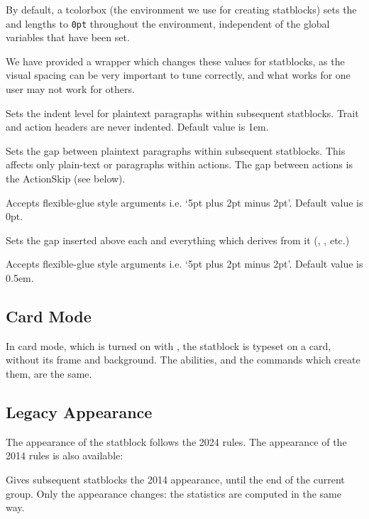 		By default, a tcolorbox (the environment we use for creating statblocks) sets the  and  lengths to \texttt{0pt} throughout the environment, independent of the global variables that have been set.

		We have provided a wrapper which changes these values for statblocks, as the visual spacing can be very important to tune correctly, and what works for one user may not work for others.

		{
			Sets the indent level for plaintext paragraphs within subsequent statblocks. Trait and action headers are never indented. Default value is 1em.
		}
		{
			Sets the gap between plaintext paragraphs within subsequent statblocks. This affects only plain-text or paragraphs within actions. The gap between actions is the ActionSkip (see below).

			Accepts flexible-glue style arguments i.e. `5pt plus 2pt minus 2pt'. Default value is 0pt.
		}
		{
			Sets the gap inserted above each  and everything which derives from it (, ,  etc.)

			Accepts flexible-glue style arguments i.e. `5pt plus 2pt minus 2pt'. Default value is 0.5em.
		}

	\subsection{Card Mode}

		In card mode, which is turned on with  , the statblock is typeset on a card, without its frame and background. The abilities, and the commands which create them, are the same.

	\subsection{Legacy Appearance}\label{S:DndStatLegacy}

		The appearance of the statblock follows the 2024 rules. The appearance of the 2014 rules is also available:

		{
			Gives subsequent statblocks the 2014 appearance, until the end of the current group. Only the appearance changes: the statistics are computed in the same way.
		}

